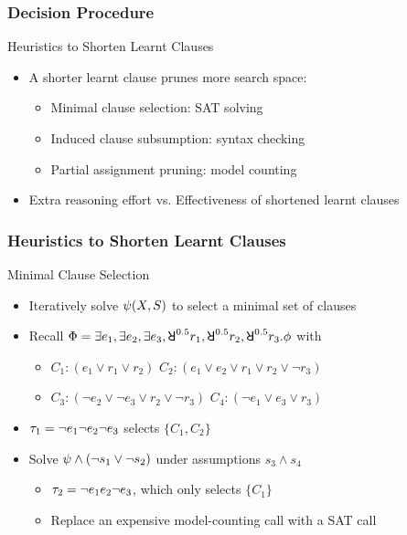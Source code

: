 \begin{frame}
    \frametitle{Decision Procedure}
    \begin{block}{Heuristics to Shorten Learnt Clauses}
        \begin{itemize}
            \item A shorter learnt clause prunes more search space:
                  \pause
                  \begin{itemize}
                      \item Minimal clause selection: SAT solving
                            \pause
                      \item Induced clause subsumption: syntax checking
                            \pause
                      \item Partial assignment pruning: model counting
                            \pause
                  \end{itemize}
            \item Extra reasoning effort vs. Effectiveness of shortened learnt clauses
        \end{itemize}
    \end{block}
\end{frame}

\begin{frame}
    \frametitle{Heuristics to Shorten Learnt Clauses}
    \begin{block}{Minimal Clause Selection}
        \begin{itemize}
            \item Iteratively solve $\psi(X,S)$ to select a minimal set of clauses
                  \pause
            \item Recall $\Qf=\exists e_1,\exists e_2,\exists e_3,\random{0.5} r_1,\random{0.5} r_2,\random{0.5} r_3.\pf$ with
                  \begin{itemize}
                      \item[] $C_1: (e_1 \lor r_1 \lor r_2)$ $C_2: (e_1 \lor e_2 \lor r_1 \lor r_2 \lor \lnot r_3)$
                      \item[] $C_3: (\lnot e_2 \lor \lnot e_3 \lor r_2 \lor \lnot r_3)$ $C_4: (\lnot e_1 \lor e_3 \lor r_3)$
                  \end{itemize}
                  \pause
            \item $\tau_1=\lnot e_1 \lnot e_2 \lnot e_3$ selects $\{C_1,C_2\}$
                  \pause
            \item Solve $\psi\land(\lnot s_1\lor\lnot s_2)$ under assumptions $s_3\land s_4$
                  \pause
                  \begin{itemize}
                      \item $\tau_2=\lnot e_1 e_2 \lnot e_3$, which only selects $\{C_1\}$
                            \pause
                      \item Replace an expensive model-counting call with a SAT call
                  \end{itemize}
        \end{itemize}
    \end{block}
\end{frame}

